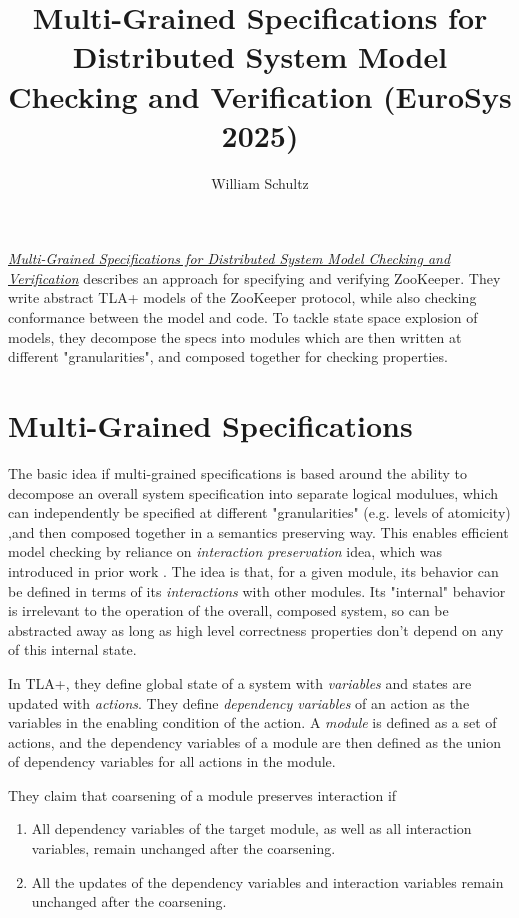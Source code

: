 \documentclass[11pt, oneside]{article}   	%
\title{Multi-Grained Specifications for Distributed System Model Checking and Verification (EuroSys 2025)}
\author{William Schultz}
\begin{document}
\maketitle


\href{https://dl.acm.org/doi/10.1145/3689031.3696069}{\textit{Multi-Grained Specifications for Distributed System Model Checking and Verification}} \cite{2025multigrained} describes an approach for specifying and verifying ZooKeeper. They write abstract TLA+ models of the ZooKeeper protocol, while also checking conformance between the model and code. To tackle state space explosion of models, they decompose the specs into modules which are then written at different "granularities", and composed together for checking properties.


\section*{Multi-Grained Specifications}

The basic idea if multi-grained specifications is based around the ability to decompose an overall system specification into separate logical modulues, which can independently be specified at different "granularities" (e.g. levels of atomicity) ,and then composed together in a semantics preserving way. This enables efficient model checking by reliance on \textit{interaction preservation} idea, which was introduced in prior work \cite{gu2022compositionalmodelcheckingconsensus}. The idea is that, for a given module, its behavior can be defined in terms of its \textit{interactions} with other modules. Its "internal" behavior is irrelevant to the operation of the overall, composed system, so can be abstracted away as long as high level correctness properties don't depend on any of this internal state.

In TLA+, they define global state of a system with \textit{variables} and states are updated with \textit{actions}. They define \textit{dependency variables} of an action as the variables in the enabling condition of the action. A \textit{module} is defined as a set of actions, and the dependency variables of a module are then defined as the union of dependency variables for all actions in the module.

They claim that coarsening of a module preserves interaction if 

\begin{enumerate}[(1)]
    \item All dependency variables of the target module, as well as all interaction variables, remain unchanged after the coarsening.
    \item All the updates of the dependency variables and interaction variables remain unchanged after the coarsening.
\end{enumerate}
\end{document}

